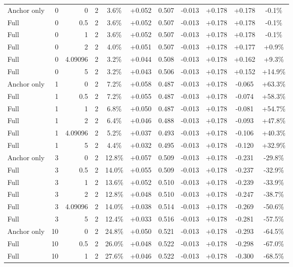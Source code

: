 \begin{table}[htbp]
\begin{tabular}{lrrrccccccc}
Anchor only & 0 & 0 & 2 & 3.6\% & +0.052 & 0.507 & -0.013 & +0.178 & +0.178 & -0.1\% \\
Full & 0 & 0.5 & 2 & 3.6\% & +0.052 & 0.507 & -0.013 & +0.178 & +0.178 & -0.1\% \\
Full & 0 & 1 & 2 & 3.6\% & +0.052 & 0.507 & -0.013 & +0.178 & +0.178 & -0.1\% \\
Full & 0 & 2 & 2 & 4.0\% & +0.051 & 0.507 & -0.013 & +0.178 & +0.177 & +0.9\% \\
Full & 0 & 4.09096 & 2 & 3.2\% & +0.044 & 0.508 & -0.013 & +0.178 & +0.162 & +9.3\% \\
Full & 0 & 5 & 2 & 3.2\% & +0.043 & 0.506 & -0.013 & +0.178 & +0.152 & +14.9\% \\
Anchor only & 1 & 0 & 2 & 7.2\% & +0.058 & 0.487 & -0.013 & +0.178 & -0.065 & +63.3\% \\
Full & 1 & 0.5 & 2 & 7.2\% & +0.055 & 0.487 & -0.013 & +0.178 & -0.074 & +58.3\% \\
Full & 1 & 1 & 2 & 6.8\% & +0.050 & 0.487 & -0.013 & +0.178 & -0.081 & +54.7\% \\
Full & 1 & 2 & 2 & 6.4\% & +0.046 & 0.488 & -0.013 & +0.178 & -0.093 & +47.8\% \\
Full & 1 & 4.09096 & 2 & 5.2\% & +0.037 & 0.493 & -0.013 & +0.178 & -0.106 & +40.3\% \\
Full & 1 & 5 & 2 & 4.4\% & +0.032 & 0.495 & -0.013 & +0.178 & -0.120 & +32.9\% \\
Anchor only & 3 & 0 & 2 & 12.8\% & +0.057 & 0.509 & -0.013 & +0.178 & -0.231 & -29.8\% \\
Full & 3 & 0.5 & 2 & 14.0\% & +0.055 & 0.509 & -0.013 & +0.178 & -0.237 & -32.9\% \\
Full & 3 & 1 & 2 & 13.6\% & +0.052 & 0.510 & -0.013 & +0.178 & -0.239 & -33.9\% \\
Full & 3 & 2 & 2 & 12.8\% & +0.048 & 0.510 & -0.013 & +0.178 & -0.247 & -38.7\% \\
Full & 3 & 4.09096 & 2 & 14.0\% & +0.038 & 0.514 & -0.013 & +0.178 & -0.269 & -50.6\% \\
Full & 3 & 5 & 2 & 12.4\% & +0.033 & 0.516 & -0.013 & +0.178 & -0.281 & -57.5\% \\
Anchor only & 10 & 0 & 2 & 24.8\% & +0.050 & 0.521 & -0.013 & +0.178 & -0.293 & -64.5\% \\
Full & 10 & 0.5 & 2 & 26.0\% & +0.048 & 0.522 & -0.013 & +0.178 & -0.298 & -67.0\% \\
Full & 10 & 1 & 2 & 27.6\% & +0.046 & 0.522 & -0.013 & +0.178 & -0.300 & -68.5\% \\

\end{tabular}
\end{table}
